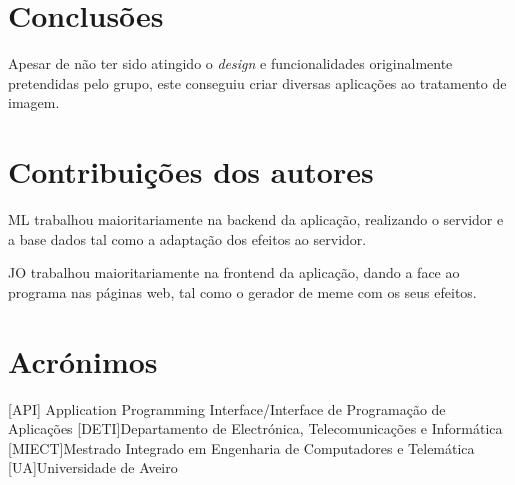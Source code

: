 \documentclass{report}
\begin{document}
\chapter{Conclusões}
\label{chap.conc}
	Apesar de não ter sido atingido o \textit{design} e funcionalidades originalmente pretendidas pelo grupo, este conseguiu criar diversas aplicações ao tratamento de imagem.


\chapter*{Contribuições dos autores}

ML trabalhou maioritariamente na backend da aplicação, realizando o servidor e a base dados tal como a adaptação dos efeitos ao servidor.

JO trabalhou maioritariamente na frontend da aplicação, dando a face ao programa nas páginas web, tal como o gerador de meme com os seus efeitos.

\chapter*{Acrónimos}
\begin{acronym}
 [API] {Application Programming Interface/Interface de Programação de Aplicações}
 [DETI]{Departamento de Electrónica, Telecomunicações e Informática}
 [MIECT]{Mestrado Integrado em Engenharia de Computadores e Telemática}
 [UA]{Universidade de Aveiro}
\end{acronym}


%
\end{document}
